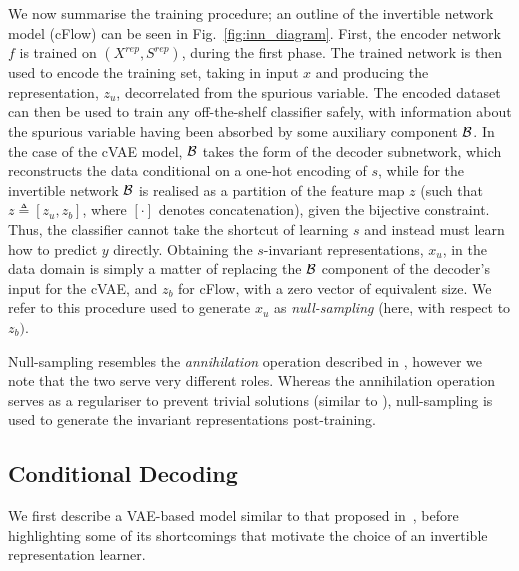 We now summarise the training procedure; an outline of the invertible network model (\acs{cFlow})
can be seen in Fig.~\ref{fig:inn_diagram}.
%
First, the encoder network $f$ is trained on \( (X^{rep}, S^{rep}) \), during the first
phase.
%
The trained network is then used to encode the training set, taking in input $x$ and producing the
representation, $z_u$, decorrelated from the spurious variable.
%
The encoded dataset can then be used to train any off-the-shelf classifier safely, with information
about the spurious variable having been absorbed by some auxiliary component ${\mathcal{B}}$.
%
In the case of the \acf{cVAE} model, ${\mathcal{B}}$ takes the form of the decoder subnetwork, which
reconstructs the data conditional on a one-hot encoding of $s$, while for the invertible network
${\mathcal{B}}$ is realised as a partition of the feature map $z$ (such that $z \triangleq [z_u, z_b]$,
where \( [\cdot] \) denotes concatenation), given the bijective constraint.
%
Thus, the classifier cannot take the shortcut of learning $s$ and instead must learn how to predict
$y$ directly.
%
Obtaining the $s$-invariant representations, $x_u$, in the data domain is simply a matter of
replacing the ${\mathcal{B}}$ component of the decoder's input for the \ac{cVAE}, and $z_b$ for
\ac{cFlow}, with a zero vector of equivalent size.
%
We refer to this procedure used to generate $x_u$ as \emph{null-sampling} (here, with respect
to $z_b)$.

Null-sampling resembles the \emph{annihilation} operation described in \citet{xiao2017dna}, however
we note that the two serve very different roles.  
%
Whereas the annihilation operation serves as a regulariser to prevent trivial solutions (similar to
\citealp{jaiswal2018unsupervised}), null-sampling is used to generate the invariant representations
post-training.

\subsection{Conditional Decoding}%
%
\label{conddec}
\noindent We first describe a \acs{VAE}-based model similar to that proposed
in~\citet{madras2018learning}, before highlighting some of its shortcomings that motivate the
choice of an invertible representation learner.


